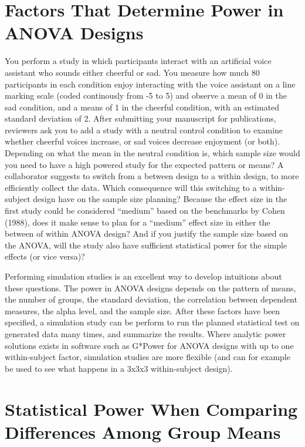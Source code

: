 \documentclass[,man,floatsintext]{apa6}
\begin{document}
\section{Factors That Determine Power in ANOVA
Designs}\label{factors-that-determine-power-in-anova-designs}

You perform a study in which participants interact with an artificial
voice assistant who sounds either cheerful or sad. You measure how much
80 participants in each condition enjoy interacting with the voice
assistant on a line marking scale (coded continously from -5 to 5) and
observe a mean of 0 in the sad condition, and a means of 1 in the
cheerful condition, with an estimated standard deviation of 2. After
submitting your manuscript for publications, reviewers ask you to add a
study with a neutral control condition to examine whether cheerful
voices increase, or sad voices decrease enjoyment (or both). Depending
on what the mean in the neutral condition is, which sample size would
you need to have a high powered study for the expected pattern or means?
A collaborator suggests to switch from a between design to a within
design, to more efficiently collect the data. Which consequence will
this switching to a within-subject design have on the sample size
planning? Because the effect size in the first study could be considered
\enquote{medium} based on the benchmarks by Cohen (1988), does it make
sense to plan for a \enquote{medium} effect size in either the between
of within ANOVA design? And if you justify the sample size based on the
ANOVA, will the study also have sufficient statistical power for the
simple effects (or vice versa)?

Performing simulation studies is an excellent way to develop intuitions
about these questions. The power in ANOVA designs depends on the pattern
of means, the number of groups, the standard deviation, the correlation
between dependent measures, the alpha level, and the sample size. After
these factors have been specified, a simulation study can be perform to
run the planned statistical test on generated data many times, and
summarize the results. Where analytic power solutions exists in software
such as G*Power for ANOVA designs with up to one within-subject factor,
simulation studies are more flexible (and can for example be used to see
what happens in a 3x3x3 within-subject design).

\section{Statistical Power When Comparing Differences Among Group
Means}\label{statistical-power-when-comparing-differences-among-group-means}
\end{document}
